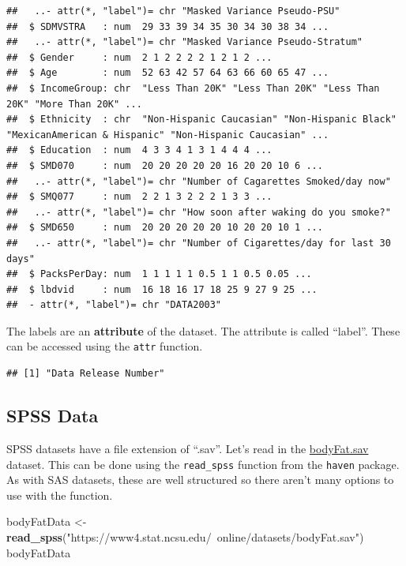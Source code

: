 \documentclass[
]{book}
\newenvironment{Shaded}{\begin{snugshade}}{\end{snugshade}}
\newcommand{\KeywordTok}[1]{\textcolor[rgb]{0.13,0.29,0.53}{\textbf{#1}}}
\newcommand{\NormalTok}[1]{#1}
\newcommand{\OperatorTok}[1]{\textcolor[rgb]{0.81,0.36,0.00}{\textbf{#1}}}
\newcommand{\StringTok}[1]{\textcolor[rgb]{0.31,0.60,0.02}{#1}}
\theoremstyle{definition}
\theoremstyle{definition}
\theoremstyle{definition}
\theoremstyle{remark}
\begin{document}
\begin{verbatim}
##   ..- attr(*, "label")= chr "Masked Variance Pseudo-PSU"
##  $ SDMVSTRA   : num  29 33 39 34 35 30 34 30 38 34 ...
##   ..- attr(*, "label")= chr "Masked Variance Pseudo-Stratum"
##  $ Gender     : num  2 1 2 2 2 2 1 2 1 2 ...
##  $ Age        : num  52 63 42 57 64 63 66 60 65 47 ...
##  $ IncomeGroup: chr  "Less Than 20K" "Less Than 20K" "Less Than 20K" "More Than 20K" ...
##  $ Ethnicity  : chr  "Non-Hispanic Caucasian" "Non-Hispanic Black" "MexicanAmerican & Hispanic" "Non-Hispanic Caucasian" ...
##  $ Education  : num  4 3 3 4 1 3 1 4 4 4 ...
##  $ SMD070     : num  20 20 20 20 20 16 20 20 10 6 ...
##   ..- attr(*, "label")= chr "Number of Cagarettes Smoked/day now"
##  $ SMQ077     : num  2 2 1 3 2 2 2 1 3 3 ...
##   ..- attr(*, "label")= chr "How soon after waking do you smoke?"
##  $ SMD650     : num  20 20 20 20 20 10 20 20 10 1 ...
##   ..- attr(*, "label")= chr "Number of Cigarettes/day for last 30 days"
##  $ PacksPerDay: num  1 1 1 1 1 0.5 1 1 0.5 0.05 ...
##  $ lbdvid     : num  16 18 16 17 18 25 9 27 9 25 ...
##  - attr(*, "label")= chr "DATA2003"
\end{verbatim}

The labels are an \textbf{attribute} of the dataset. The attribute is called ``label''. These can be accessed using the \texttt{attr} function.

\begin{Shaded}
\end{Shaded}

\begin{verbatim}
## [1] "Data Release Number"
\end{verbatim}

\hypertarget{spss-data-1}{%
\subsection{SPSS Data}\label{spss-data-1}}

SPSS datasets have a file extension of ``.sav''. Let's read in the \href{https://www4.stat.ncsu.edu/~online/datasets/bodyFat.sav}{bodyFat.sav} dataset. This can be done using the \texttt{read\_spss} function from the \texttt{haven} package. As with SAS datasets, these are well structured so there aren't many options to use with the function.

\begin{Shaded}
\begin{Highlighting}[]
\NormalTok{bodyFatData <-}\StringTok{ }\KeywordTok{read_spss}\NormalTok{(}\StringTok{"https://www4.stat.ncsu.edu/~online/datasets/bodyFat.sav"}\NormalTok{)}
\NormalTok{bodyFatData}
\end{Highlighting}
\end{Shaded}
\end{document}
